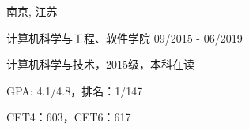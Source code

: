 \vspace{-4.0mm}

\begin{cventries}
\vspace{-1.5mm}
\cveducation
{}
{南京, 江苏}

\cvsubeducation
{计算机科学与工程、软件学院}
{09/2015 - 06/2019}
{
    \begin{cvitems}
    \item {计算机科学与技术，2015级，本科在读}
    \item {GPA: 4.1/4.8，排名：1/147}
    \item{CET4：603，CET6：617}
    \end{cvitems}
}

\end{cventries}